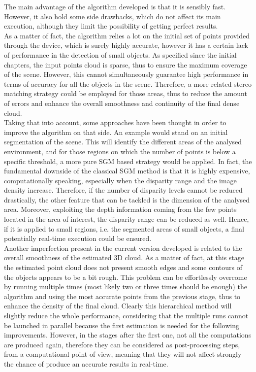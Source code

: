 The main advantage of the algorithm developed is that it is sensibly fast.
However, it also hold some side drawbacks, which do not affect its main execution, although they limit the possibility of getting perfect results.\\
As a matter of fact, the algorithm relies a lot on the initial set of points provided through the device, which is surely highly accurate, however it has a certain lack of performance in the detection of small objects.
As specified since the initial chapters, the input points cloud is sparse, thus to ensure the maximum coverage of the scene. 
However, this cannot simultaneously guarantee high performance in terms of accuracy for all the objects in the scene.
Therefore, a more related stereo matching strategy could be employed for those areas, thus to reduce the amount of errors and enhance the overall smoothness and continuity of the final dense cloud.\\
Taking that into account, some approaches have been thought in order to improve the algorithm on that side.
An example would stand on an initial segmentation of the scene.
This will identify the different areas of the analysed environment, and for those regions on which the number of points is below a specific threshold, a more pure SGM based strategy would be applied. 
In fact, the fundamental downside of the classical SGM method is that it is highly expensive, computationally speaking, especially when the disparity range and the image density increase.
Therefore, if the number of disparity levels cannot be reduced drastically, the other feature that can be tackled is the dimension of the analysed area.
Moreover, exploiting the depth information coming from the few points located in the area of interest, the disparity range can be reduced as well.
Hence, if it is applied to small regions, i.e. the segmented areas of small objects, a final potentially real-time execution could be ensured.\\
Another imperfection present in the current version developed is related to the overall smoothness of the estimated 3D cloud.
As a matter of fact, at this stage the estimated point cloud does not present smooth edges and some contours of the objects appears to be a bit rough.
This problem can be effortlessly overcome by running multiple times (most likely two or three times should be enough) the algorithm and using the most accurate points from the previous stage, thus to enhance the density of the final cloud. 
Clearly this hierarchical method will slightly reduce the whole performance, considering that the multiple runs cannot be launched in parallel because the first estimation is needed for the following improvements.
However, in the stages after the first one, not all the computations are produced again, therefore they can be considered as post-processing steps, from a computational point of view, meaning that they will not affect strongly the chance of produce an accurate results in real-time.

